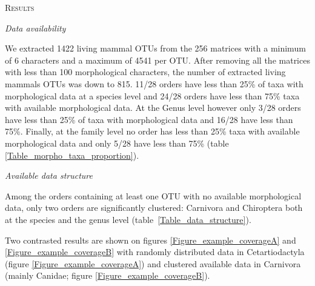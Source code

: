 \documentclass[12pt,letterpaper]{article}
\renewcommand{\section}[1]{%
\bigskip
\begin{center}
\begin{Large}
\normalfont\scshape #1
\medskip
\end{Large}
\end{center}}
\renewcommand{\subsection}[1]{%
\bigskip
\begin{center}
\begin{large}
\normalfont\itshape #1
\end{large}
\end{center}}
\begin{document}
\section{Results}

\subsection{Data availability}
We extracted 1422 living mammal OTUs from the 256 matrices with a minimum of 6 characters and a maximum of 4541 per OTU. After removing all the matrices with less than 100 morphological characters, the number of extracted living mammals OTUs was down to 815. 11/28 orders have less than 25\% of taxa with morphological data at a species level and 24/28 orders have less than 75\% taxa with available morphological data. At the Genus level however only 3/28 orders have less than 25\% of taxa with morphological data and 16/28 have less than 75\%. Finally, at the family level no order has less than 25\% taxa with available morphological data and only 5/28 have less than 75\% (table \ref{Table_morpho_taxa_proportion}).

\renewcommand\baselinestretch{1.2}\selectfont
\begin{center}

\end{center}
\renewcommand\baselinestretch{2}\selectfont

\subsection{Available data structure}
Among the orders containing at least one OTU with no available morphological data, only two orders are significantly clustered: Carnivora and Chiroptera both at the species and the genus level (table~\ref{Table_data_structure}).

\renewcommand\baselinestretch{1.2}\selectfont
\begin{center}

\end{center}
\renewcommand\baselinestretch{2}\selectfont

Two contrasted results are shown on figures \ref{Figure_example_coverageA} and \ref{Figure_example_coverageB} with randomly distributed data in Cetartiodactyla (figure \ref{Figure_example_coverageA}) and clustered available data in Carnivora (mainly Canidae; figure \ref{Figure_example_coverageB}).
\end{document}
